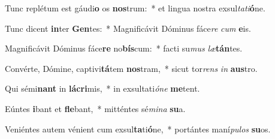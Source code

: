\item Tunc replétum est gáudi\textbf{o} os \textbf{nos}trum:~* et lingua nostra exsul\textit{ta}\textit{ti}\textbf{ó}ne.
\item Tunc dicent \textbf{in}ter \textbf{Gen}tes:~* Magnificávit Dóminus fáce\textit{re} \textit{cum} \textbf{e}is.
\item Magnificávit Dóminus fáce\textbf{re} no\textbf{bís}cum:~* facti su\textit{mus} \textit{læ}\textbf{tán}tes.
\item Convérte, Dómine, captivi\textbf{tá}tem \textbf{nos}tram,~* sicut tor\textit{rens} \textit{in} \textbf{aus}tro.
\item Qui sémi\textbf{nant} in \textbf{lá}\textbf{cri}mis,~* in exsultati\textit{ó}\textit{ne} \textbf{me}tent.
\item Eúntes \textbf{i}bant et \textbf{fle}bant,~* mitténtes sé\textit{mi}\textit{na} \textbf{su}a.
\item Veniéntes autem vénient cum exsul\textbf{ta}ti\textbf{ó}ne,~* portántes maní\textit{pu}\textit{los} \textbf{su}os.
